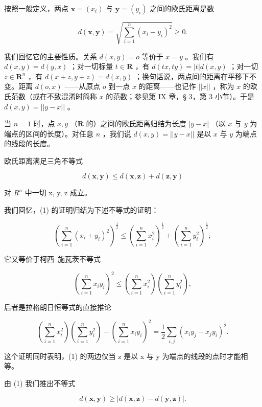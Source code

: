 按照一般定义，两点 \(\boldsymbol{x} = (x_{i})\) 与 \(\boldsymbol{y} = (y_{i})\) 之间的欧氏距离是数

\[
d (\boldsymbol {x}, \boldsymbol {y}) = \sqrt {\sum_ {i = 1} ^ {n} (x _ {i} - y _ {i}) ^ {2}} \geqslant 0.
\]

我们回忆它的主要性质。关系 \(d(x, y) = o\) 等价于 \(x = y\) 。我们有 \(d(x, y) = d(y, x)\) ；对一切标量 \(t \in \mathbf{R}\) ，有 \(d(tx, ty) = |t|d(x, y)\) ；对一切 \(z \in \mathbf{R}^n\) ，有 \(d(x + z, y + z) = d(x, y)\) ；换句话说，两点间的距离在平移下不变。距离 \(d(o, x)\) ——从原点 \(o\) 到一点 \(x\) 的距离——也记作 \(||x||\) ，称为 \(x\) 的欧氏范数（或在不致混淆时简称 \(x\) 的范数；参见第 IX 章，§ 3，第 3 小节）。于是 \(d(x, y) = ||y - x||\) 。

当 \(n = 1\) 时，点 \(x, y\) （\(\mathbf{R}\) 的）之间的欧氏距离归结为长度 \(|y - x|\) （以 \(x\) 与 \(y\) 为端点的区间的长度）。对任意 \(n\) ，我们说 \(d(x, y) = ||y - x||\) 是以 \(x\) 与 \(y\) 为端点的线段的长度。

欧氏距离满足三角不等式

\[
d (\boldsymbol {x}, \boldsymbol {y}) \leqslant d (\boldsymbol {x}, \boldsymbol {z}) + d (\boldsymbol {z}, \boldsymbol {y})\tag{1}
\]

对 \(R^{n}\) 中一切 x, y, z 成立。

我们回忆，(1) 的证明归结为下述不等式的证明：

\[
\left(\sum_ {i = 1} ^ {n} \left(x _ {i} + y _ {i}\right) ^ {2}\right) ^ {\frac {1}{2}} \leqslant \left(\sum_ {i = 1} ^ {n} x _ {i} ^ {2}\right) ^ {\frac {1}{2}} + \left(\sum_ {i = 1} ^ {n} y _ {i} ^ {2}\right) ^ {\frac {1}{2}};
\]

它又等价于柯西–施瓦茨不等式

\[
\left(\sum_ {i = 1} ^ {n} x _ {i} y _ {i}\right) ^ {2} \leqslant \left(\sum_ {i = 1} ^ {n} x _ {i} ^ {2}\right) \left(\sum_ {i = 1} ^ {n} y _ {i} ^ {2}\right),
\]

后者是拉格朗日恒等式的直接推论

\[
\left(\sum_ {i = 1} ^ {n} x _ {i} ^ {2}\right) \left(\sum_ {i = 1} ^ {n} y _ {i} ^ {2}\right) - \left(\sum_ {i = 1} ^ {n} x _ {i} y _ {i}\right) ^ {2} = \frac {1}{2} \sum_ {i, j} (x _ {i} y _ {j} - x _ {j} y _ {i}) ^ {2}.
\]

这个证明同时表明，(1) 的两边仅当 z 是以 x 与 y 为端点的线段的点时才能相等。

由 (1) 我们推出不等式

\[
d (\boldsymbol {x}, \boldsymbol {y}) \geqslant | d (\boldsymbol {x}, \boldsymbol {z}) - d (\boldsymbol {y}, \boldsymbol {z}) |.\tag{2}
\]

